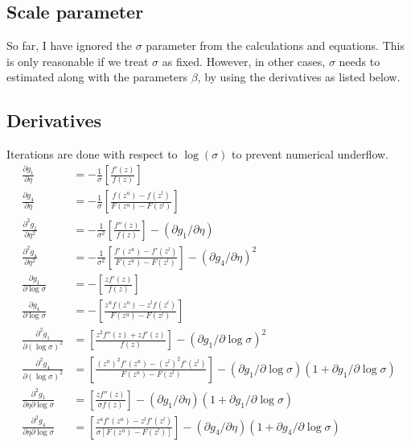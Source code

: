 \documentclass[12pt,a4paper]{report}
\begin{document}
\subsection*{Scale parameter}
So far, I have ignored the $\sigma$ parameter from the calculations and equations. This is only
reasonable if we treat $\sigma$ as fixed. However, in other cases, $\sigma$ needs to estimated along with the parameters $\beta$, by using the derivatives as listed below.

\subsection*{Derivatives}
Iterations are done with respect to $\log(\sigma)$ to prevent numerical underflow.
\begin{equation}
\begin{split}
\frac{\partial g_1}{\partial \eta} & = - \frac{1}{\sigma} \left [ \frac{f'(z)}{f(z)} \right ] \\
\frac{\partial g_4}{\partial \eta} & = - \frac{1}{\sigma} \left [ \frac{f(z^u) - f(z^l)} {F(z^u) - F(z^l)} \right ] \\
\frac{\partial^2 g_1}{\partial \eta^2} & = - \frac{1}{\sigma^2} \left [ \frac{f''(z)}{f(z)} \right ] - \left ({\partial g_1}/{\partial \eta} \right ) \\
\frac{\partial^2 g_4}{\partial \eta^2} & = - \frac{1}{\sigma^2} \left [ \frac{f'(z^u) - f'(z^l)} {F(z^u) - F(z^l)} \right ] - \left ({\partial g_4}/{\partial \eta} \right )^2 \\
\frac{\partial g_1}{\partial \log \sigma} & = - \left [ \frac{z f'(z)}{f(z)} \right ] \\
\frac{\partial g_4}{\partial \log \sigma} & = - \left [ \frac{z^u f(z^u) - z^l f(z^l)} {F(z^u) - F(z^l)} \right ] \\
\frac{\partial^2 g_1}{\partial (\log \sigma )^2} & = \left [ \frac{z^2 f''(z) + z f'(z)}{f(z)} \right ] - \left ({\partial g_1}/{\partial \log \sigma } \right )^2 \\
\frac{\partial^2 g_4}{\partial (\log \sigma )^2} & = \left [ \frac{(z^u )^2 f'(z^u) - (z^l )^2 f'(z^l)} {F(z^u) - F(z^l)} \right ] - (\partial g_1 / \partial \log \sigma) (1 + \partial g_1 / \partial \log \sigma ) \\
\frac{\partial^2 g_1}{\partial \eta \partial \log \sigma} & = \left [\frac{z f''(z)} {\sigma f(z)} \right ] - (\partial g_1 / \partial \eta) (1 + \partial g_1 / \partial \log \sigma ) \\
\frac{\partial^2 g_4}{\partial \eta \partial \log \sigma} & = \left [\frac{z^u f'(z^u ) - z^l f'(z^l)} {\sigma [F(z^u) - F(z^l)]} \right ] - (\partial g_4 / \partial \eta) (1 + \partial g_4 / \partial \log \sigma ) \\
\end{split}  		%
\end{equation}
\end{document}
